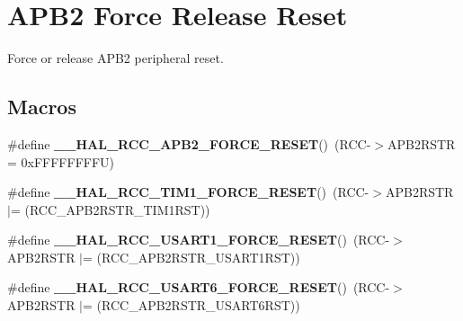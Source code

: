 \hypertarget{group___r_c_c___a_p_b2___force___release___reset}{}\section{A\+P\+B2 Force Release Reset}
\label{group___r_c_c___a_p_b2___force___release___reset}


Force or release A\+P\+B2 peripheral reset.  


\subsection*{Macros}
\begin{DoxyCompactItemize}
\item 
\mbox{\label{group___r_c_c___a_p_b2___force___release___reset_ga8788da8c644ad0cc54912baede7d49b4}} 
\#define {\bfseries \+\_\+\+\_\+\+H\+A\+L\+\_\+\+R\+C\+C\+\_\+\+A\+P\+B2\+\_\+\+F\+O\+R\+C\+E\+\_\+\+R\+E\+S\+ET}()~(R\+CC-\/$>$A\+P\+B2\+R\+S\+TR = 0x\+F\+F\+F\+F\+F\+F\+F\+F\+U)
\item 
\mbox{\label{group___r_c_c___a_p_b2___force___release___reset_gac423d6a52fa42423119844e4a7d68c7b}} 
\#define {\bfseries \+\_\+\+\_\+\+H\+A\+L\+\_\+\+R\+C\+C\+\_\+\+T\+I\+M1\+\_\+\+F\+O\+R\+C\+E\+\_\+\+R\+E\+S\+ET}()~(R\+CC-\/$>$A\+P\+B2\+R\+S\+TR $\vert$= (R\+C\+C\+\_\+\+A\+P\+B2\+R\+S\+T\+R\+\_\+\+T\+I\+M1\+R\+ST))
\item 
\mbox{\label{group___r_c_c___a_p_b2___force___release___reset_ga5db01cf30bf3c5c7fc0b42220f4c70ad}} 
\#define {\bfseries \+\_\+\+\_\+\+H\+A\+L\+\_\+\+R\+C\+C\+\_\+\+U\+S\+A\+R\+T1\+\_\+\+F\+O\+R\+C\+E\+\_\+\+R\+E\+S\+ET}()~(R\+CC-\/$>$A\+P\+B2\+R\+S\+TR $\vert$= (R\+C\+C\+\_\+\+A\+P\+B2\+R\+S\+T\+R\+\_\+\+U\+S\+A\+R\+T1\+R\+ST))
\item 
\mbox{\label{group___r_c_c___a_p_b2___force___release___reset_ga36242e7bdc7abbbdc33c06e72c4b45c7}} 
\#define {\bfseries \+\_\+\+\_\+\+H\+A\+L\+\_\+\+R\+C\+C\+\_\+\+U\+S\+A\+R\+T6\+\_\+\+F\+O\+R\+C\+E\+\_\+\+R\+E\+S\+ET}()~(R\+CC-\/$>$A\+P\+B2\+R\+S\+TR $\vert$= (R\+C\+C\+\_\+\+A\+P\+B2\+R\+S\+T\+R\+\_\+\+U\+S\+A\+R\+T6\+R\+ST))
\item 

\end{DoxyCompactItemize}
